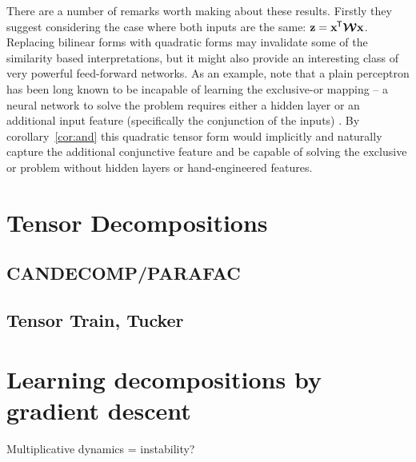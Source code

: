 There are a number of remarks worth making about these results. Firstly they suggest considering
the case where both inputs are the same: \(\mathbf{z} = \mathbf{x}^{\mkern-1.5mu\mathsf{T}}\bm{\mathcal{W}}\mathbf{x}\). Replacing
bilinear forms with quadratic forms may invalidate some of the similarity based interpretations,
but it might also provide an interesting class of very powerful feed-forward networks. As an example,
note that a plain perceptron has been long known to be incapable of learning the exclusive-or
mapping \autocite{Minsky1969} -- a neural network to solve the problem requires either a hidden layer
or an additional input feature (specifically the conjunction of the inputs) \autocite{Rumelhart1986}.
By corollary~\ref{cor:and} this quadratic tensor form would implicitly and naturally capture the
additional conjunctive feature and be capable of solving the exclusive or problem without hidden
layers or hand-engineered features.

\section{Tensor Decompositions}
\subsection{CANDECOMP/PARAFAC}
\subsection{Tensor Train, Tucker}

\section{Learning decompositions by gradient descent}
Multiplicative dynamics = instability?